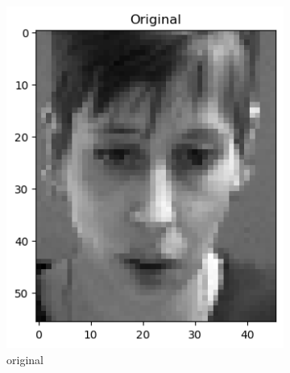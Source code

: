 \begin{figure}
	\centering
	\begin{subfigure}[t]{0.2\linewidth}
		\centering
		\includegraphics[width=\linewidth]{image/q1_recon_test_original.png}
		\caption{original}
		\label{fig:test_re_original}
	\end{subfigure}%
	\hfill
	\begin{subfigure}[t]{0.2\linewidth}
		\centering

\end{subfigure}
\end{figure}
